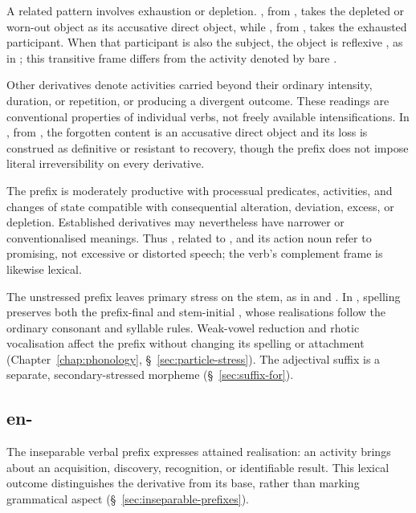 A related pattern involves exhaustion or depletion. , from , takes the depleted or worn-out object as its accusative direct object, while , from , takes the exhausted participant. When that participant is also the subject, the object is reflexive , as in ; this transitive frame differs from the activity denoted by bare .

Other derivatives denote activities carried beyond their ordinary intensity, duration, or repetition, or producing a divergent outcome. These readings are conventional properties of individual verbs, not freely available intensifications. In , from , the forgotten content is an accusative direct object and its loss is construed as definitive or resistant to recovery, though the prefix does not impose literal irreversibility on every derivative.

The prefix is moderately productive with processual predicates, activities, and changes of state compatible with consequential alteration, deviation, excess, or depletion. Established derivatives may nevertheless have narrower or conventionalised meanings. Thus , related to , and its action noun  refer to promising, not excessive or distorted speech; the verb's complement frame is likewise lexical.

The unstressed prefix leaves primary stress on the stem, as in  and . In , spelling preserves both the prefix-final and stem-initial , whose realisations follow the ordinary consonant and syllable rules. Weak-vowel reduction and rhotic vocalisation affect the prefix without changing its spelling or attachment (Chapter~\ref{chap:phonology}, \S~\ref{sec:particle-stress}). The adjectival suffix  is a separate, secondary-stressed morpheme (\S~\ref{sec:suffix-for}).

\subsection{en-}
\label{sec:prefix-en}

The inseparable verbal prefix  expresses attained realisation: an activity brings about an acquisition, discovery, recognition, or identifiable result. This lexical outcome distinguishes the derivative from its base, rather than marking grammatical aspect (\S~\ref{sec:inseparable-prefixes}).

